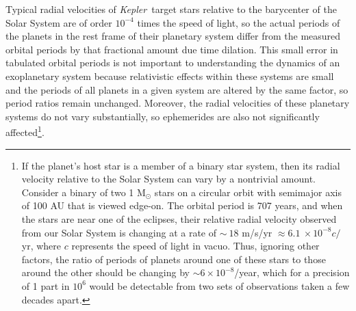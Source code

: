 \documentclass{aastex62}
\newcommand{\ik}{{\it Kepler~}}
\begin{document}
Typical radial velocities of \ik target stars relative to the barycenter of the Solar System are of order $10^{-4}$ times the speed of light, so the actual periods of the planets in the rest frame of their planetary system differ from the measured orbital periods by that fractional amount due time dilation.  This small error in tabulated orbital periods is not important to understanding the dynamics of an exoplanetary system because relativistic effects within these systems are small and the periods of all planets in a given system are altered by the same factor, so period ratios remain unchanged.  Moreover, the radial velocities of these planetary systems do not vary substantially, so ephemerides are also not significantly affected\footnote{If the planet's host star is a member of a binary star system, then its radial velocity relative to the Solar System can vary by a nontrivial amount. Consider a binary of two 1 M$_\odot$ stars on a circular orbit with semimajor axis of 100 AU that is viewed edge-on. The orbital period is 707 years, and when the stars are near one of the eclipses, their relative radial velocity observed from our Solar System is changing at a rate of $\sim~18$ m/s/yr $\approx 6.1~\times 10^{-8} c/$yr, where $c$ represents the speed of light in vacuo. Thus, ignoring other factors, the ratio of periods of planets around one of these stars to those around the other should be changing by $\sim 6\times 10^{-8}$/year, which for a precision of 1 part in $10^6$ would be detectable from two sets of observations taken a few decades apart.}.
\end{document}
